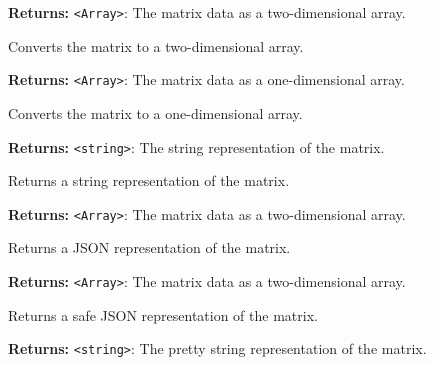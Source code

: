 \documentclass[12pt,a4paper]{article}
\begin{document}
\noindent \textbf{Returns:} \texttt{<Array>}: The matrix data as a two-dimensional array.

\noindent Converts the matrix to a two-dimensional array.

\vspace{5mm}
\noindent {}


\noindent \textbf{Returns:} \texttt{<Array>}: The matrix data as a one-dimensional array.

\noindent Converts the matrix to a one-dimensional array.

\vspace{5mm}
\noindent {}


\noindent \textbf{Returns:} \texttt{<string>}: The string representation of the matrix.

\noindent Returns a string representation of the matrix.

\vspace{5mm}
\noindent {}


\noindent \textbf{Returns:} \texttt{<Array>}: The matrix data as a two-dimensional array.

\noindent Returns a JSON representation of the matrix.

\vspace{5mm}
\noindent {}


\noindent \textbf{Returns:} \texttt{<Array>}: The matrix data as a two-dimensional array.

\noindent Returns a safe JSON representation of the matrix.

\vspace{5mm}
\noindent {}


\noindent \textbf{Returns:} \texttt{<string>}: The pretty string representation of the matrix.
\end{document}
